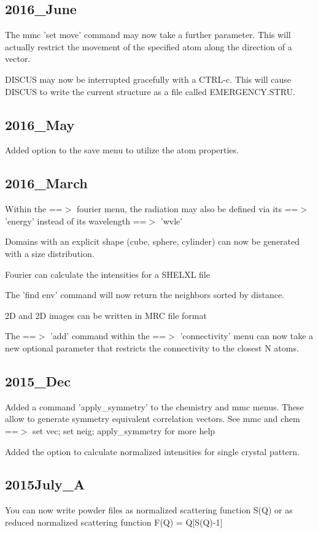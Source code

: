 \subsection*{2016\_June}
\par
The mmc 'set move' command may now take a further parameter. This 
will actually restrict the movement of the specified atom along 
the direction of a vector. 
\par
DISCUS may now be interrupted gracefully with a CTRL-c. 
This will cause DISCUS to write the current structure 
as a file called EMERGENCY.STRU. 
\subsection*{2016\_May}
\par
Added option to the save menu to utilize the atom properties. 
\subsection*{2016\_March}
\par
Within the ==$> $ fourier menu, the radiation may also be defined 
via its ==$> $ 'energy' instead of its wavelength ==$> $ 'wvle' 
\par
Domains with an explicit shape (cube, sphere, cylinder) can now 
be generated with a size distribution. 
\par
Fourier can calculate the intensities for a SHELXL file 
\par
The 'find env' command will now return the neighbors sorted by distance. 
\par
2D and 2D images can be written in MRC file format 
\par
The ==$> $ 'add' command within the ==$> $ 'connectivity' menu can now take 
a new optional parameter that restricts the connectivity to the 
closest N atoms. 
\subsection*{2015\_Dec}
\par
Added a command 'apply\_symmetry' to the chemistry and mmc menus. 
These allow to generate symmetry equivalent correlation vectors. 
See mmc and chem ==$> $ set vec; set neig; apply\_symmetry for more help 
\par
Added the option to calculate normalized intensities for single 
crystal pattern. 
\subsection*{2015July\_A}
\par
You can now write powder files as normalized scattering function S(Q) 
or as reduced normalized scattering function F(Q) = Q[S(Q)-1] 
\par
